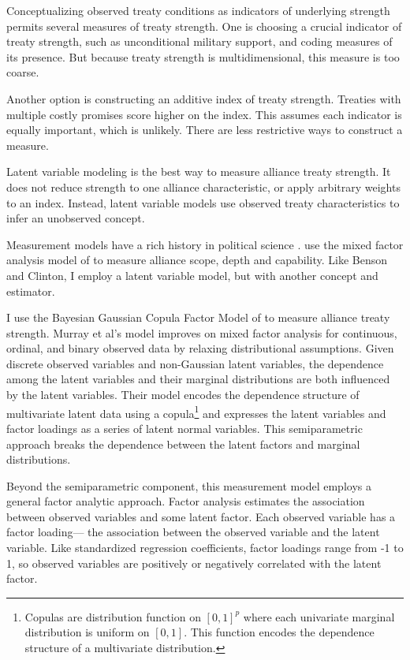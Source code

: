 \documentclass[12pt]{article}
\begin{document}
Conceptualizing observed treaty conditions as indicators of underlying strength permits several measures of treaty strength. 
One is choosing a crucial indicator of treaty strength, such as unconditional military support, and coding measures of its presence. 
But because treaty strength is multidimensional, this measure is too coarse. 


Another option is constructing an additive index of treaty strength. 
Treaties with multiple costly promises score higher on the index. 
This assumes each indicator is equally important, which is unlikely. 
There are less restrictive ways to construct a measure. 


Latent variable modeling is the best way to measure alliance treaty strength. 
It does not reduce strength to one alliance characteristic, or apply arbitrary weights to an index. 
Instead, latent variable models use observed treaty characteristics to infer an unobserved concept. 


Measurement models have a rich history in political science \citep{Clintonetal2004, TreierJackman2008, Fariss2014}. 
\citet{BensonClinton2016} use the mixed factor analysis model of \citet{Quinn2004} to measure alliance scope, depth and capability.
Like Benson and Clinton, I employ a latent variable model, but with another concept and estimator. 


I use the Bayesian Gaussian Copula Factor Model of \citet{Murrayetal2013} to measure alliance treaty strength. 
Murray et al's model improves on mixed factor analysis for continuous, ordinal, and binary observed data by relaxing distributional assumptions. 
Given discrete observed variables and non-Gaussian latent variables, the dependence among the latent variables and their marginal distributions are both influenced by the latent variables.
Their model encodes the dependence structure of multivariate latent data using a copula\footnote{
Copulas are distribution function on $[0, 1]^p$ where each univariate marginal distribution is uniform on $[0,1]$. This function encodes the dependence structure of a multivariate distribution.
} 
and expresses the latent variables and factor loadings as a series of latent normal variables. 
This semiparametric approach breaks the dependence between the latent factors and marginal distributions. 


Beyond the semiparametric component, this measurement model employs a general factor analytic approach.
Factor analysis estimates the association between observed variables and some latent factor.
Each observed variable has a factor loading--- the association between the observed variable and the latent variable.  
Like standardized regression coefficients, factor loadings range from -1 to 1, so observed variables are positively or negatively correlated with the latent factor.  
\end{document}
